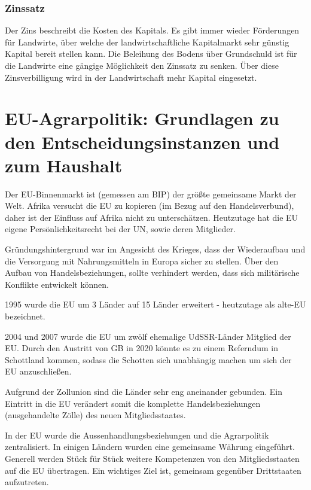\documentclass[11pt]{scrartcl}
\begin{document}
\subsubsection{Zinssatz}
Der Zins beschreibt die Kosten des Kapitals.
Es gibt immer wieder Förderungen für Landwirte, über welche der landwirtschaftliche Kapitalmarkt sehr günstig Kapital bereit stellen kann.
Die Beleihung des Bodens über Grundschuld ist für die Landwirte eine gängige Möglichkeit den Zinssatz zu senken.
Über diese Zinsverbilligung wird in der Landwirtschaft mehr Kapital eingesetzt.

\section{\ac{EU}-Agrarpolitik: Grundlagen zu den Entscheidungsinstanzen und zum Haushalt}

Der \ac{EU}-Binnenmarkt ist (gemessen am \ac{BIP}) der größte gemeinsame Markt der Welt.
Afrika versucht die \ac{EU} zu kopieren (im Bezug auf den Handelsverbund), daher ist der Einfluss auf Afrika nicht zu unterschätzen.
Heutzutage hat die \ac{EU} eigene Persönlichkeitsrecht bei der \ac{UN}, sowie deren Mitglieder.

Gründungshintergrund war im Angesicht des Krieges, dass der Wiederaufbau und die Versorgung mit Nahrungsmitteln in Europa sicher zu stellen.
Über den Aufbau von Handelsbeziehungen, sollte verhindert werden, dass sich militärische Konflikte entwickelt können.

1995 wurde die \ac{EU} um 3 Länder auf 15 Länder erweitert - heutzutage als \glqq alte\grqq{}-\ac{EU} bezeichnet.

2004 und 2007 wurde die \ac{EU} um zwölf ehemalige \ac{UdSSR}-Länder Mitglied der \ac{EU}.
Durch den Austritt von \ac{GB} in 2020 könnte es zu einem Referndum in Schottland kommen, sodass die Schotten sich unabhängig machen um sich der \ac{EU} anzuschließen.

Aufgrund der Zollunion sind die Länder sehr eng aneinander gebunden.
Ein Eintritt in die \ac{EU} verändert somit die komplette Handelsbeziehungen (ausgehandelte Zölle) des neuen Mitgliedsstaates.

In der \ac{EU} wurde die Aussenhandlungsbeziehungen und die Agrarpolitik zentralisiert.
In einigen Ländern wurden eine gemeinsame Währung eingeführt.
Generell werden Stück für Stück weitere Kompetenzen von den Mitgliedsstaaten auf die \ac{EU} übertragen.
Ein wichtiges Ziel ist, gemeinsam gegenüber Drittstaaten aufzutreten.
\end{document}
